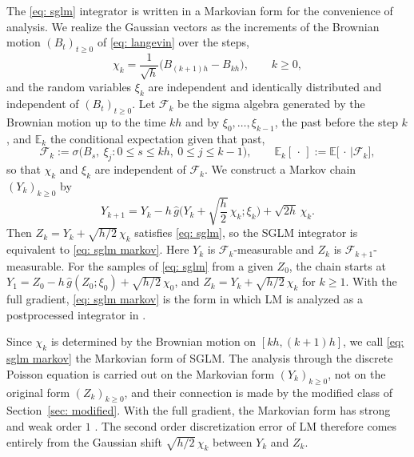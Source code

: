 \documentclass{article}
\newcommand{\Le}{\leqslant}
\newcommand{\Ge}{\geqslant}
\numberwithin{equation}{section}
\begin{document}
The \eqref{eq: sglm} integrator is written in a Markovian form for the convenience of analysis. We realize the Gaussian vectors as the increments of the Brownian motion $(B_t)_{t \Ge 0}$ of \eqref{eq: langevin} over the steps,
\begin{equation*}
	\chi_k = \frac1{\sqrt{h}}\big(B_{(k+1)h} - B_{kh}\big), \qquad k \Ge 0 ,
\end{equation*}
and the random variables $\xi_k$ are independent and identically distributed and independent of $(B_t)_{t \Ge 0}$. Let $\mathcal F_k$ be the sigma algebra generated by the Brownian motion up to the time $kh$ and by $\xi_0, \dots, \xi_{k-1}$, the past before the step $k$, and $\mathbb E_k$ the conditional expectation given that past,
\begin{equation}
	\mathcal F_k := \sigma\bigl( B_s ,\ \xi_j : 0 \Le s \Le kh ,\ 0 \Le j \Le k-1 \bigr) , \qquad
	\mathbb E_k[\,\cdot\,] := \mathbb E\bigl[\,\cdot\, \big| \mathcal F_{k}\bigr] ,
	\label{eq: filtration}
\end{equation}
so that $\chi_k$ and $\xi_k$ are independent of $\mathcal F_{k}$. We construct a Markov chain $(Y_k)_{k\Ge0}$ by
\begin{equation}
	Y_{k+1} = Y_k - h\, \hat g\Big(Y_k + \sqrt{\frac h2}\, \chi_k; \xi_k\Big) + \sqrt{2h}\, \chi_k .
	\label{eq: sglm markov}
	\tag{SGLM'}
\end{equation}
Then $Z_k = Y_k + \sqrt{h/2}\, \chi_k$ satisfies \eqref{eq: sglm}, so the SGLM integrator is equivalent to \eqref{eq: sglm markov}. Here $Y_k$ is $\mathcal F_{k}$-measurable and $Z_k$ is $\mathcal F_{k+1}$-measurable. For the samples of \eqref{eq: sglm} from a given $Z_0$, the chain starts at $Y_1 = Z_0 - h\, \hat g(Z_0;\xi_0) + \sqrt{h/2}\, \chi_0$, and $Z_k = Y_k + \sqrt{h/2}\, \chi_k$ for $k \Ge 1$. With the full gradient, \eqref{eq: sglm markov} is the form in which LM is analyzed as a postprocessed integrator in \citep{vilmart2015postprocessed}.

Since $\chi_k$ is determined by the Brownian motion on $[kh,(k+1)h]$, we call \eqref{eq: sglm markov} the Markovian form of SGLM. The analysis through the discrete Poisson equation is carried out on the Markovian form $(Y_k)_{k \Ge 0}$, not on the original form $(Z_k)_{k \Ge 0}$, and their connection is made by the modified class of Section~\ref{sec: modified}. With the full gradient, the Markovian form has strong and weak order $1$ \citep{ye2026mse}. The second order discretization error of LM therefore comes entirely from the Gaussian shift $\sqrt{h/2}\, \chi_k$ between $Y_k$ and $Z_k$.
\end{document}
